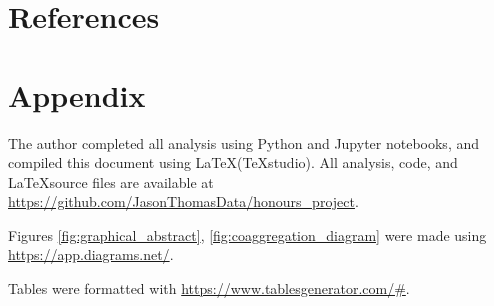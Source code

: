 \documentclass[hidelinks]{article}
\begin{document}
\newpage

\section{References}
\printbibliography[heading=none]
\citereset

\newpage

\section{Appendix}

The author completed all analysis using Python and Jupyter notebooks, and compiled this document using \LaTeX \space (TeXstudio). All analysis, code, and \LaTeX \space source files are available at \url{https://github.com/JasonThomasData/honours_project}.

Figures \ref{fig:graphical_abstract}, \ref{fig:coaggregation_diagram} were made using \url{https://app.diagrams.net/}.

Tables were formatted with \url{https://www.tablesgenerator.com/#}.
\end{document}
